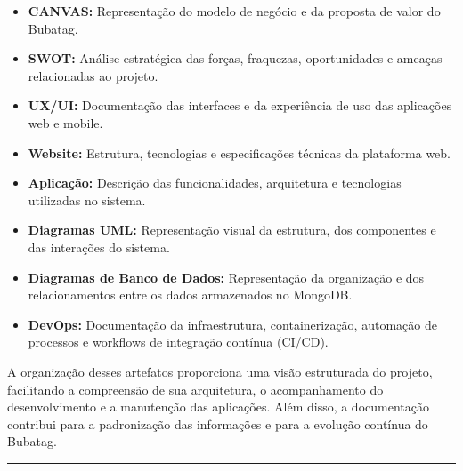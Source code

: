 \documentclass[11pt,a4paper]{article}
\begin{document}
\begin{itemize}
    \item \textbf{CANVAS:} Representação do modelo de negócio e da proposta de valor do Bubatag.

    \item \textbf{SWOT:} Análise estratégica das forças, fraquezas, oportunidades e ameaças relacionadas ao projeto.

    \item \textbf{UX/UI:} Documentação das interfaces e da experiência de uso das aplicações web e mobile.

    \item \textbf{Website:} Estrutura, tecnologias e especificações técnicas da plataforma web.

    \item \textbf{Aplicação:} Descrição das funcionalidades, arquitetura e tecnologias utilizadas no sistema.

    \item \textbf{Diagramas UML:} Representação visual da estrutura, dos componentes e das interações do sistema.

    \item \textbf{Diagramas de Banco de Dados:} Representação da organização e dos relacionamentos entre os dados armazenados no MongoDB.

    \item \textbf{DevOps:} Documentação da infraestrutura, containerização, automação de processos e workflows de integração contínua (CI/CD).
\end{itemize}

A organização desses artefatos proporciona uma visão estruturada do projeto, facilitando a compreensão de sua arquitetura, o acompanhamento do desenvolvimento e a manutenção das aplicações. Além disso, a documentação contribui para a padronização das informações e para a evolução contínua do Bubatag.

\vspace{1cm}
\noindent\rule{\textwidth}{0.5pt}
\vspace{0.3cm}

\newpage
{}


\end{document}
